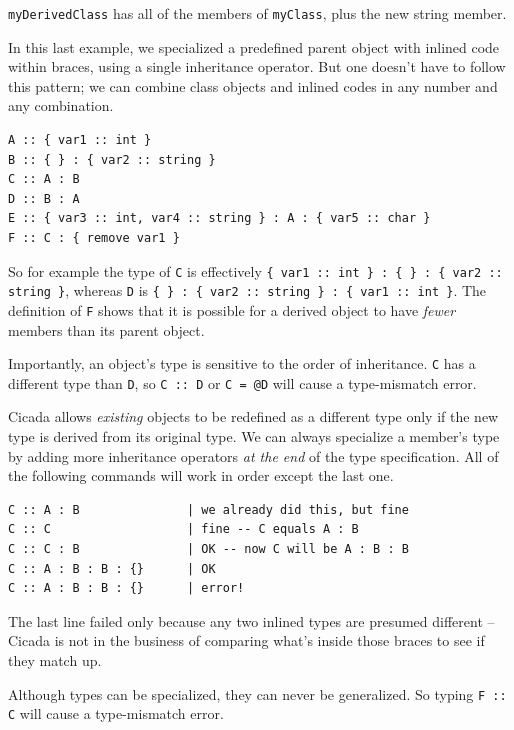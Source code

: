 \documentclass{article}
\newenvironment{code}{
       \begin{list}{}{
               \setlength{\leftmargin}{.4in}
               \setlength{\rightmargin}{0in}
               \setlength{\topsep}{.2in}
       }
       \small
       \item[] }
       { \end{list}   }
\begin{document}
\noindent \verb#myDerivedClass# has all of the members of \verb#myClass#, plus the new string member.

In this last example, we specialized a predefined parent object with inlined code within braces, using a single inheritance operator.  But one doesn't have to follow this pattern; we can combine class objects and inlined codes in any number and any combination.

\begin{code} \begin{verbatim}
A :: { var1 :: int }
B :: { } : { var2 :: string }
C :: A : B
D :: B : A
E :: { var3 :: int, var4 :: string } : A : { var5 :: char }
F :: C : { remove var1 }
\end{verbatim} \end{code}

\noindent So for example the type of \verb#C# is effectively \verb#{ var1 :: int } : { } : { var2 :: string }#, whereas \verb#D# is \verb#{ } : { var2 :: string } : { var1 :: int }#.  The definition of \verb#F# shows that it is possible for a derived object to have \emph{fewer} members than its parent object.

Importantly, an object's type is sensitive to the order of inheritance.  \verb#C# has a different type than \verb#D#, so \verb#C :: D# or \verb#C = @D# will cause a type-mismatch error.

Cicada allows \emph{existing} objects to be redefined as a different type only if the new type is derived from its original type.  We can always specialize a member's type by adding more inheritance operators \emph{at the end} of the type specification.  All of the following commands will work in order except the last one.

\begin{code} \begin{verbatim}
C :: A : B               | we already did this, but fine
C :: C                   | fine -- C equals A : B
C :: C : B               | OK -- now C will be A : B : B
C :: A : B : B : {}      | OK
C :: A : B : B : {}      | error!
\end{verbatim} \end{code}

\noindent The last line failed only because any two inlined types are presumed different -- Cicada is not in the business of comparing what's inside those braces to see if they match up.

Although types can be specialized, they can never be generalized.  So typing \verb#F :: C# will cause a type-mismatch error.
\end{document}
